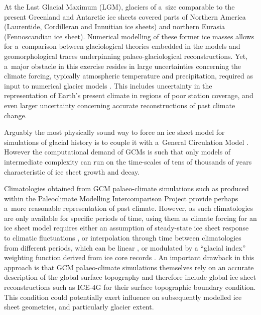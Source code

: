 \documentclass[tc, ms]{copernicus}
\begin{document}
\introduction
\label{sec:intro}

At the Last Glacial Maximum (LGM), glaciers of a~size comparable to the present Greenland and Antarctic ice sheets covered parts of Northern America (Laurentide, Cordilleran and Innuitian ice sheets) and northern Eurasia (Fennoscandian ice sheet). Numerical modelling of these former ice masses allows for a~comparison between glaciological theories embedded in the models and geomorphological traces underpinning palaeo-glaciological reconstructions. Yet, a~major obstacle in this exercise resides in large uncertainties concerning the climate forcing, typically atmospheric temperature and precipitation, required as input to numerical glacier models \citep{hebeler-etal-2008}. This includes uncertainty in the representation of Earth's present climate in regions of poor station coverage, and even larger uncertainty concerning accurate reconstructions of past climate change.

Arguably the most physically sound way to force an ice sheet model for simulations of glacial history is to couple it with a~General Circulation Model \citep[GCM;][]{yoshimori-etal-2001,calov-etal-2002,abeouchi-etal-2007,charbit-etal-2013}. However the computational demand of GCMs is such that only models of intermediate complexity can run on the time-scales of tens of thousands of years characteristic of ice sheet growth and decay.

Climatologies obtained from GCM palaeo-climate simulations such as produced within the Paleoclimate Modelling Intercomparison Project \citep[PMIP;][]{joussaume-taylor-1995} provide perhaps a~more reasonable representation of past climate. However, as such climatologies are only available for specific periods of time, using them as climate forcing for an ice sheet model requires either an assumption of steady-state ice sheet response to climatic fluctuations \citep{huybrechts-tsiobbel-1996}, or interpolation through time between climatologies from different periods, which can be linear \citep{charbit-etal-2002}, or modulated by a ``glacial index'' weighting function derived from ice core  records \citep{marshall-clarke-1999,tarasov-peltier-2004,zweck-huybrechts-2005,gregoire-etal-2012}. An important drawback in this approach is that GCM palaeo-climate simulations themselves rely on an accurate description of the global surface topography and therefore include global ice sheet reconstructions such as ICE-4G \citep{peltier-1994} for their surface topographic boundary condition. This condition could potentially exert influence on subsequently modelled ice sheet geometries, and particularly glacier extent.
\end{document}
